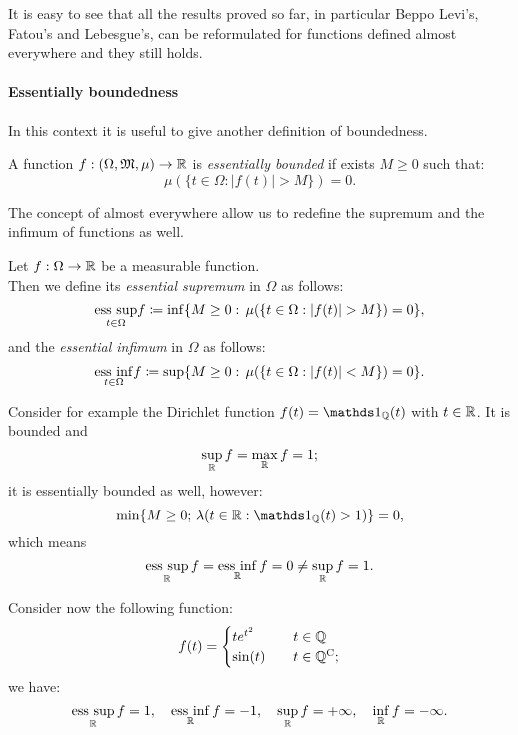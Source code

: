 It is easy to see that all the results proved so far, in particular Beppo Levi's, Fatou's and Lebesgue's, can be reformulated for functions defined almost everywhere and they still holds.

\paragraph{Essentially boundedness} In this context it is useful to give another definition of boundedness.
\begin{defn}
	A function $f:(\Omega, \mathfrak M, \mu) \to \mathbb R$ is \emph{essentially bounded} if exists $M \geq 0$ such that:
	$$\mu (\{t \in \Omega: |f(t)|>M\})=0.$$
\end{defn}

The concept of almost everywhere allow us to redefine the supremum and the infimum of functions as well.
\begin{defn}
	Let $f:\Omega \to \mathbb R$ be a measurable function.\\
	Then we define its \emph{essential supremum} in $\Omega$ as follows:
	$$\underset{t \in \Omega}{\operatorname*{ess\ sup}} f\coloneqq \inf \{M \geq 0 : \, \mu (\{t \in \Omega : |f(t)| > M\}) = 0\},$$
	and the \emph{essential infimum} in $\Omega$ as follows:
	$$\underset{t \in \Omega}{\operatorname*{ess\ inf}} f\coloneqq \sup \{M \geq 0 : \, \mu (\{t \in \Omega : |f(t)| < M\}) = 0\}.$$
\end{defn}

\begin{exam}
	Consider for example the Dirichlet function $f(t)=\Ind_\QQ(t)$ with $t \in \mathbb R$. It is bounded and 
	$$
		\sup_\mathbb R f 
		= \max_\mathbb R f 
		= 1
	;
	$$ 
	it is essentially bounded as well, however: 
	$$
		\min \{M\geq 0; \, \lambda( t \in \RR : \Ind_\QQ (t) > 1 )\}
		= 0
	,
	$$
	which means 
	$$
		\operatorname*{ess\ sup}_\mathbb R f 
		= \operatorname*{ess\ inf}_\mathbb R f 
		= 0 
		\neq \sup_\mathbb R f 
		= 1
	.
	$$ 
\end{exam}

\begin{exam}
	Consider now the following function:
	$$ 
		f(t) = \begin{cases}
			t e^{t^2} \quad & t \in \mathbb Q \\
			\sin(t) \quad & t \in \mathbb Q^{\mathrm{C}}
		;
		\end{cases}
	$$
	we have: 
	$$
		\operatorname*{ess\ sup}_\mathbb R f = 1, 
		\quad \operatorname*{ess\ inf}_\mathbb R f = -1, 
		\quad \sup_\mathbb R f = + \infty, 
		\quad \inf_\mathbb R f = - \infty
	.
	$$
\end{exam}


